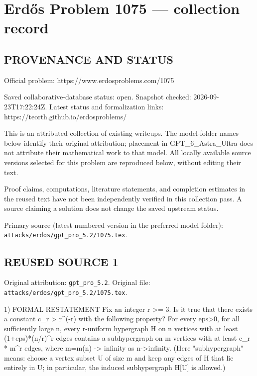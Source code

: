 \section*{Erd\H{o}s Problem 1075 --- collection record}

\subsection*{PROVENANCE AND STATUS}
Official problem: https://www.erdosproblems.com/1075

Saved collaborative-database status: open.
Snapshot checked: 2026-09-23T17:22:24Z.
Latest status and formalization links: https://teorth.github.io/erdosproblems/

This is an attributed collection of existing writeups. The model-folder names below identify their original attribution; placement in GPT\_6\_Astra\_Ultra does not attribute their mathematical work to that model. All locally available source versions selected for this problem are reproduced below, without editing their text.

Proof claims, computations, literature statements, and completion estimates in the reused text have not been independently verified in this collection pass. A source claiming a solution does not change the saved upstream status.

Primary source (latest numbered version in the preferred model folder): \texttt{attacks/erdos/gpt\_pro\_5.2/1075.tex}.

\subsection*{REUSED SOURCE 1}
Original attribution: \texttt{gpt\_pro\_5.2}.
Original file: \texttt{attacks/erdos/gpt\_pro\_5.2/1075.tex}.


1) FORMAL RESTATEMENT
Fix an integer r >= 3.
Is it true that there exists a constant c_r > r^(-r) with the following property?
For every eps>0, for all sufficiently large n, every r-uniform hypergraph H on n vertices with at least (1+eps)*(n/r)^r edges contains a subhypergraph on m vertices with at least c_r * m^r edges, where m=m(n) -> infinity as n->infinity.
(Here "subhypergraph" means: choose a vertex subset U of size m and keep any edges of H that lie entirely in U; in particular, the induced subhypergraph H[U] is allowed.)

